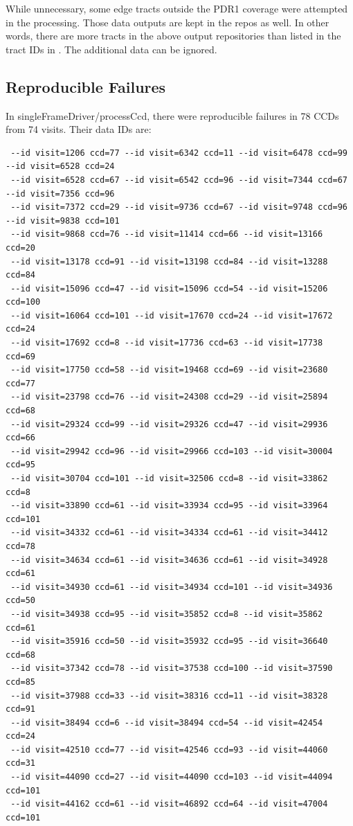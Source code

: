 \documentclass[DM,authoryear,toc]{lsstdoc}
\begin{document}
While unnecessary, some edge tracts outside the PDR1 coverage were attempted in the processing. Those data outputs are kept in the repos as well. In other words, there are more tracts in the above output repositories than listed in the tract IDs in . The additional data can be ignored.

\subsection{Reproducible Failures} \label{reproducibleFailures}
In singleFrameDriver/processCcd, there were reproducible failures in 78 CCDs from 74 visits. Their data IDs are:

\begin{verbatim}
 --id visit=1206 ccd=77 --id visit=6342 ccd=11 --id visit=6478 ccd=99 --id visit=6528 ccd=24
 --id visit=6528 ccd=67 --id visit=6542 ccd=96 --id visit=7344 ccd=67 --id visit=7356 ccd=96
 --id visit=7372 ccd=29 --id visit=9736 ccd=67 --id visit=9748 ccd=96 --id visit=9838 ccd=101
 --id visit=9868 ccd=76 --id visit=11414 ccd=66 --id visit=13166 ccd=20
 --id visit=13178 ccd=91 --id visit=13198 ccd=84 --id visit=13288 ccd=84
 --id visit=15096 ccd=47 --id visit=15096 ccd=54 --id visit=15206 ccd=100
 --id visit=16064 ccd=101 --id visit=17670 ccd=24 --id visit=17672 ccd=24
 --id visit=17692 ccd=8 --id visit=17736 ccd=63 --id visit=17738 ccd=69
 --id visit=17750 ccd=58 --id visit=19468 ccd=69 --id visit=23680 ccd=77
 --id visit=23798 ccd=76 --id visit=24308 ccd=29 --id visit=25894 ccd=68
 --id visit=29324 ccd=99 --id visit=29326 ccd=47 --id visit=29936 ccd=66
 --id visit=29942 ccd=96 --id visit=29966 ccd=103 --id visit=30004 ccd=95
 --id visit=30704 ccd=101 --id visit=32506 ccd=8 --id visit=33862 ccd=8
 --id visit=33890 ccd=61 --id visit=33934 ccd=95 --id visit=33964 ccd=101
 --id visit=34332 ccd=61 --id visit=34334 ccd=61 --id visit=34412 ccd=78
 --id visit=34634 ccd=61 --id visit=34636 ccd=61 --id visit=34928 ccd=61
 --id visit=34930 ccd=61 --id visit=34934 ccd=101 --id visit=34936 ccd=50
 --id visit=34938 ccd=95 --id visit=35852 ccd=8 --id visit=35862 ccd=61
 --id visit=35916 ccd=50 --id visit=35932 ccd=95 --id visit=36640 ccd=68
 --id visit=37342 ccd=78 --id visit=37538 ccd=100 --id visit=37590 ccd=85
 --id visit=37988 ccd=33 --id visit=38316 ccd=11 --id visit=38328 ccd=91
 --id visit=38494 ccd=6 --id visit=38494 ccd=54 --id visit=42454 ccd=24
 --id visit=42510 ccd=77 --id visit=42546 ccd=93 --id visit=44060 ccd=31
 --id visit=44090 ccd=27 --id visit=44090 ccd=103 --id visit=44094 ccd=101
 --id visit=44162 ccd=61 --id visit=46892 ccd=64 --id visit=47004 ccd=101
\end{verbatim}
\end{document}
